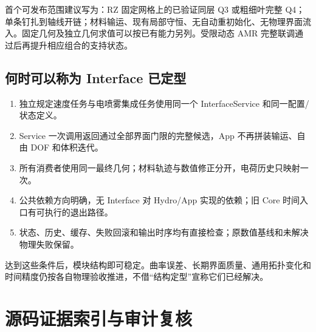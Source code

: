 \documentclass[UTF8,a4paper,11pt,fontset=fandol]{ctexart}
\begin{document}
首个可发布范围建议写为：RZ 固定网格上的已验证同层 Q3 或粗细叶完整 Q4；单条钉扎到轴线开链；材料输运、现有局部守恒、无自动重初始化、无物理界面流入。固定几何及独立几何求值可以按已有能力另列。受限动态 AMR 完整联调通过后再提升相应组合的支持状态。

\subsection{何时可以称为 Interface 已定型}
\begin{enumerate}
\item 独立规定速度任务与电喷雾集成任务使用同一个 InterfaceService 和同一配置/状态定义。
\item Service 一次调用返回通过全部界面门限的完整候选，App 不再拼装输运、自由 DOF 和体积迭代。
\item 所有消费者使用同一最终几何；材料轨迹与数值修正分开，电荷历史只映射一次。
\item 公共依赖方向明确，无 Interface 对 Hydro/App 实现的依赖；旧 Core 时间入口有可执行的退出路径。
\item 状态、历史、缓存、失败回滚和输出时序均有直接检查；原数值基线和未解决物理失败保留。
\end{enumerate}
达到这些条件后，模块结构即可稳定。曲率误差、长期界面质量、通用拓扑变化和时间精度仍按各自物理验收推进，不借“结构定型”宣称它们已经解决。

\clearpage
\appendix
\section{源码证据索引与审计复核}
\end{document}
